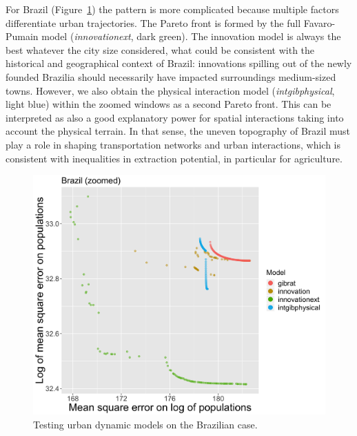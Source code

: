 \documentclass[11pt]{article}
\begin{document}
For Brazil (Figure~\ref{fig:fig7}) the pattern is more complicated because multiple factors differentiate urban trajectories. The Pareto front is formed by the full Favaro-Pumain model (\textit{innovationext}, dark green). The innovation model is always the best whatever the city size considered,  what could be consistent with the historical and geographical context of Brazil: innovations spilling out of the newly founded Brazilia should necessarily have impacted surroundings medium-sized towns. However, we also obtain the physical interaction model (\textit{intgibphysical}, light blue) within the zoomed windows as a second Pareto front. This can be interpreted as also a good explanatory power for spatial interactions taking into account the physical terrain. In that sense, the uneven topography of Brazil must play a role in shaping transportation networks and urban interactions, which is consistent with inequalities in extraction potential, in particular for agriculture.

\begin{figure}
\centering
\includegraphics[width=\textwidth]{Fig7.png}
\caption{Testing urban dynamic models on the Brazilian case.\label{fig:fig7}}
\end{figure}   
\end{document}
